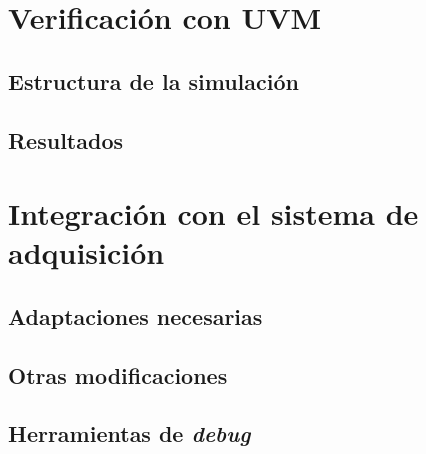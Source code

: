\documentclass[../../main.tex]{subfiles}
\begin{document}
\section{Verificación con UVM}
\subsection{Estructura de la simulación}
\subsection{Resultados}

\section{Integración con el sistema de adquisición}
\subsection{Adaptaciones necesarias}
\subsection{Otras modificaciones}
\subsection{Herramientas de \textit{debug}}
\end{document}
